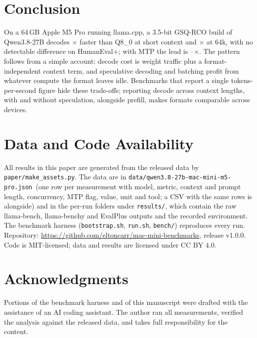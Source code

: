 \documentclass[11pt]{article}
\newcommand{\repo}{\url{https://github.com/eltoncarr/mac-mini-benchmarks}}
\newcommand{\datafile}{\texttt{data/qwen3.8-27b-mac-mini-m5-pro.json}}
\newcommand{\datarelease}{v1.0.0}
\begin{document}
\section{Conclusion}

On a 64\,GB Apple M5 Pro running llama.cpp, a 3.5-bit GSQ-RCO build of Qwen3.8-27B decodes
\tgRatioZero$\times$ faster than Q8\_0 at short context and \tgRatioLong$\times$ at 64k, with no
detectable difference on HumanEval+; with MTP the lead is \mtpRatioMin--\mtpRatioMax$\times$.
The pattern follows from a simple account: decode cost is weight traffic plus a
format-independent context term, and speculative decoding and batching profit from whatever
compute the format leaves idle. Benchmarks that report a single tokens-per-second figure
hide these trade-offs; reporting decode across context lengths, with and without
speculation, alongside prefill, makes formats comparable across devices.

\section*{Data and Code Availability}

All results in this paper are generated from the released data by
\texttt{paper/make\_assets.py}. The data are in \datafile\ (one row per measurement with
model, metric, context and prompt length, concurrency, MTP flag, value, unit and tool; a CSV
with the same rows is alongside) and in the per-run folders under \texttt{results/}, which
contain the raw llama-bench, llama-benchy and EvalPlus outputs and the recorded environment.
The benchmark harness (\texttt{bootstrap.sh}, \texttt{run.sh}, \texttt{bench/}) reproduces
every run. Repository: \repo, release \datarelease. Code is MIT-licensed; data and results
are licensed under CC BY 4.0.

\section*{Acknowledgments}

Portions of the benchmark harness and of this manuscript were drafted with the assistance
of an AI coding assistant. The author ran all measurements, verified the analysis against
the released data, and takes full responsibility for the content.
\end{document}
